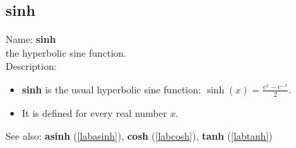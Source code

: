 \subsection{sinh}
\label{labsinh}
\noindent Name: \textbf{sinh}\\
the hyperbolic sine function.\\
\noindent Description: \begin{itemize}

\item \textbf{sinh} is the usual hyperbolic sine function: $\sinh(x) = \frac{e^x - e^{-x}}{2}$.

\item It is defined for every real number $x$.
\end{itemize}
See also: \textbf{asinh} (\ref{labasinh}), \textbf{cosh} (\ref{labcosh}), \textbf{tanh} (\ref{labtanh})

